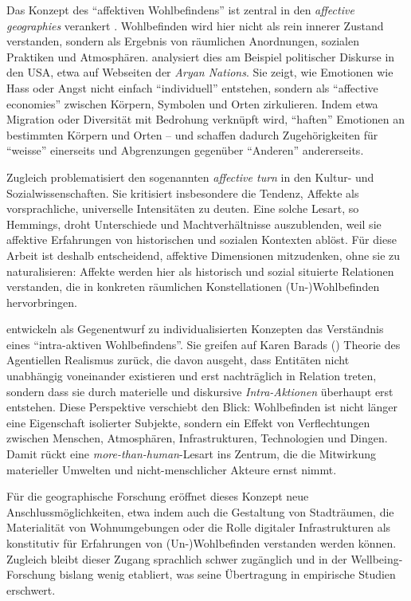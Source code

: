 Das Konzept des \enquote{affektiven Wohlbefindens} ist zentral in den \emph{affective geographies} verankert \parencite{hoSocialGeographyIII2024}. Wohlbefinden wird hier nicht als rein innerer Zustand verstanden, sondern als Ergebnis von räumlichen Anordnungen, sozialen Praktiken und Atmosphären. \textcite{ahmedAffectiveEconomies2004} analysiert dies am Beispiel politischer Diskurse in den USA, etwa auf Webseiten der \emph{Aryan Nations}. Sie zeigt, wie Emotionen wie Hass oder Angst nicht einfach \enquote{individuell} entstehen, sondern als \enquote{affective economies} zwischen Körpern, Symbolen und Orten zirkulieren. Indem etwa Migration oder Diversität mit Bedrohung verknüpft wird, \enquote{haften} Emotionen an bestimmten Körpern und Orten -- und schaffen dadurch Zugehörigkeiten für \enquote{weisse} einerseits und Abgrenzungen gegenüber \enquote{Anderen} andererseits.

Zugleich problematisiert \textcite{hemmingsInvokingAffectCultural2005} den sogenannten \emph{affective turn} in den Kultur- und Sozialwissenschaften. Sie kritisiert insbesondere die Tendenz, Affekte als vorsprachliche, universelle Intensitäten zu deuten. Eine solche Lesart, so Hemmings, droht Unterschiede und Machtverhältnisse auszublenden, weil sie affektive Erfahrungen von historischen und sozialen Kontexten ablöst. Für diese Arbeit ist deshalb entscheidend, affektive Dimensionen mitzudenken, ohne sie zu naturalisieren: Affekte werden hier als historisch und sozial situierte Relationen verstanden, die in konkreten räumlichen Konstellationen (Un\nobreakdash-)Wohlbefinden hervorbringen.

\textcite{smithWhichBeingWellbeing2018} entwickeln als Gegenentwurf zu individualisierten Konzepten das Verständnis eines \enquote{intra-aktiven Wohlbefindens}. Sie greifen auf Karen Barads (\citeyear{baradMeetingUniverseHalfway2007}) Theorie des Agentiellen Realismus zurück, die davon ausgeht, dass Entitäten nicht unabhängig voneinander existieren und erst nachträglich in Relation treten, sondern dass sie durch materielle und diskursive \emph{Intra-Aktionen} überhaupt erst entstehen. Diese Perspektive verschiebt den Blick: Wohlbefinden ist nicht länger eine Eigenschaft isolierter Subjekte, sondern ein Effekt von Verflechtungen zwischen Menschen, Atmosphären, Infrastrukturen, Technologien und Dingen. Damit rückt eine \emph{more-than-human}-Lesart ins Zentrum, die die Mitwirkung materieller Umwelten und nicht-menschlicher Akteure ernst nimmt. 

Für die geographische Forschung eröffnet dieses Konzept neue Anschlussmöglichkeiten, etwa indem auch die Gestaltung von Stadträumen, die Materialität von Wohnumgebungen oder die Rolle digitaler Infrastrukturen als konstitutiv für Erfahrungen von (Un\nobreakdash-)Wohlbefinden verstanden werden können. Zugleich bleibt dieser Zugang sprachlich schwer zugänglich und in der Wellbeing-Forschung bislang wenig etabliert, was seine Übertragung in empirische Studien erschwert.

